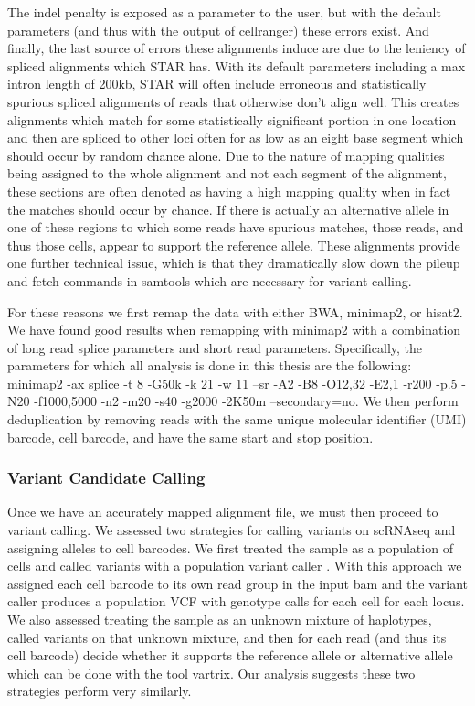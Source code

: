 \par{
The indel penalty is exposed as a parameter to the user, but with the default parameters (and thus with the output of cellranger) these errors exist. 
And finally, the last source of errors these alignments induce are due to the leniency of spliced alignments which STAR has. With its default parameters including 
a max intron length of 200kb, STAR will often include erroneous and statistically spurious spliced alignments of reads that otherwise don't align well. This creates alignments 
which match for some statistically significant portion in one location and then are spliced to other loci often for as low as an eight base segment which should occur by 
random chance alone. Due to the nature of mapping qualities being assigned to the whole alignment and not each segment of the alignment, these sections are often denoted as 
having a high mapping quality when in fact the matches should occur by chance. If there is actually an alternative allele in one of these regions to which some reads have 
spurious matches, those reads, and thus those cells, appear to support the reference allele. These alignments provide one further technical 
issue, which is that they dramatically slow down the pileup and fetch commands in samtools \cite{samtools} which are necessary for variant calling. 
} \\
\par{
For these reasons we first remap the data with either BWA, minimap2, or hisat2. We have found good results when remapping with minimap2 with a combination 
of long read splice parameters and short read parameters. Specifically, the parameters for which all analysis is done in this thesis are the following: 
minimap2 -ax splice -t 8 -G50k -k 21 -w 11 --sr -A2 -B8 -O12,32 -E2,1 -r200 -p.5 -N20 -f1000,5000 -n2 -m20 -s40 -g2000 -2K50m --secondary=no. We then perform 
deduplication by removing reads with the same unique molecular identifier (UMI) barcode, cell barcode, and have the same start and stop position.
}


\subsubsection{Variant Candidate Calling}
\par{
Once we have an accurately mapped alignment file, we must then proceed to variant calling. We assessed two strategies for calling variants on scRNAseq and assigning alleles to cell barcodes. We first treated 
the sample as a population of cells and called variants with a population variant caller \cite{freebayes} \cite{gatk} \cite{samtools}. With this approach we assigned each cell barcode to its own read group in the input bam and the variant caller produces a population VCF with genotype calls for each cell for each locus.
We also assessed treating the sample as an unknown mixture of haplotypes, called variants on that unknown mixture, and then for each read (and thus its cell barcode) decide whether it supports the reference allele or alternative allele which can be done with the tool vartrix\cite{vartrix}. Our analysis suggests these two strategies perform very similarly. 
}
